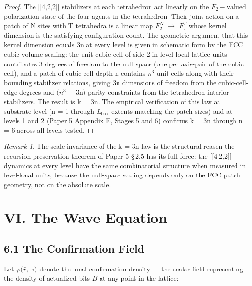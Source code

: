 \documentclass[11pt,oneside]{report}
\theoremstyle{definition}
\theoremstyle{remark}
\newtheorem{remark}[theorem]{Remark}
\begin{document}
\begin{proof}
The [[4,2,2]] stabilizers at each tetrahedron act
linearly on the \ensuremath{F_{2}-\text{valued}} polarization state of the four agents in the
tetrahedron. Their joint action on a patch of N sites with T tetrahedra
is a linear map \ensuremath{F_{2}^{N}} \ensuremath{\to} \ensuremath{F_{2}^{T}} whose kernel dimension is the
satisfying configuration count. The geometric argument that this kernel
dimension equals 3n at every level is given in schematic form by the FCC
cubic-volume scaling: the unit cubic cell of side 2 in level-local
lattice units contributes 3 degrees of freedom to the null space (one
per axis-pair of the cubic cell), and a patch of cubic-cell depth n
contains \ensuremath{n^{3}} unit cells along with their bounding stabilizer relations,
giving 3n dimensions of freedom from the cubic-cell-edge degrees and \ensuremath{(n^{3}}
\ensuremath{-} 3n) parity constraints from the tetrahedron-interior stabilizers. The
result is k = 3n. The empirical verification of this law at substrate
level (n = 1 through \ensuremath{L_{\mathrm{box}}} extents matching the patch sizes) and at
levels 1 and 2 (Paper 5 Appendix E, Stages 5 and 6) confirms k = 3n
through n = 6 across all levels tested.

\end{proof}

\begin{remark}
The scale-invariance of the k = 3n law is the
structural reason the recursion-preservation theorem of Paper 5 \S\,2.5 has
its full force: the [[4,2,2]] dynamics at every level have the
same combinatorial structure when measured in level-local units, because
the null-space scaling depends only on the FCC patch geometry, not on
the absolute scale.
\end{remark}

\section*{VI. The Wave Equation}

\subsection*{6.1 The Confirmation Field}

Let \ensuremath{\varphi (\bar{r},} \ensuremath{\tau )} denote the local confirmation density --- the scalar field
representing the density of actualized bits \ensuremath{\bar{B}} at any point in the
lattice:
\end{document}
